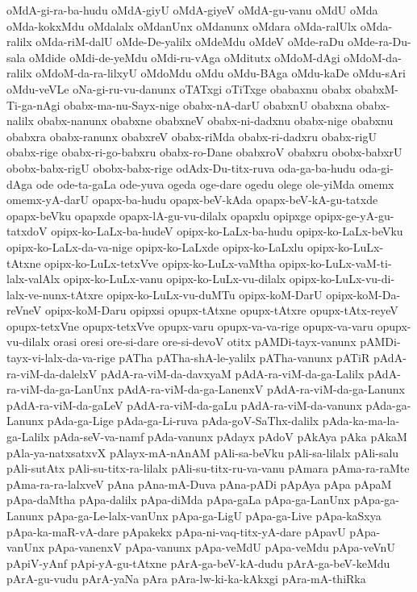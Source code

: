 {oMdA-gi-ra-ba-hudu
oMdA-giyU
oMdA-giyeV
oMdA-gu-vanu
oMdU
oMda
oMda-kokxMdu
oMdalalx
oMdanUnx
oMdanunx
oMdara
oMda-ralUlx
oMda-ralilx
oMda-riM-dalU
oMde-De-yalilx
oMdeMdu
oMdeV
oMde-raDu
oMde-ra-Du-sala
oMdide
oMdi-de-yeMdu
oMdi-ru-vAga
oMditutx
oMdoM-dAgi
oMdoM-da-ralilx
oMdoM-da-ra-lilxyU
oMdoMdu
oMdu
oMdu-BAga
oMdu-kaDe
oMdu-sAri
oMdu-veVLe
oNa-gi-ru-vu-danunx
oTATxgi
oTiTxge
obabaxnu
obabx
obabxM-Ti-ga-nAgi
obabx-ma-nu-Sayx-nige
obabx-nA-darU
obabxnU
obabxna
obabx-nalilx
obabx-nanunx
obabxne
obabxneV
obabx-ni-dadxnu
obabx-nige
obabxnu
obabxra
obabx-ranunx
obabxreV
obabx-riMda
obabx-ri-dadxru
obabx-rigU
obabx-rige
obabx-ri-go-babxru
obabx-ro-Dane
obabxroV
obabxru
obobx-babxrU
obobx-babx-rigU
obobx-babx-rige
odAdx-Du-titx-ruva
oda-ga-ba-hudu
oda-gi-dAga
ode
ode-ta-gaLa
ode-yuva
ogeda
oge-dare
ogedu
olege
ole-yiMda
omemx
omemx-yA-darU
opapx-ba-hudu
opapx-beV-kAda
opapx-beV-kA-gu-tatxde
opapx-beVku
opapxde
opapx-lA-gu-vu-dilalx
opapxlu
opipxge
opipx-ge-yA-gu-tatxdoV
opipx-ko-LaLx-ba-hudeV
opipx-ko-LaLx-ba-hudu
opipx-ko-LaLx-beVku
opipx-ko-LaLx-da-va-nige
opipx-ko-LaLxde
opipx-ko-LaLxlu
opipx-ko-LuLx-tAtxne
opipx-ko-LuLx-tetxVve
opipx-ko-LuLx-vaMtha
opipx-ko-LuLx-vaM-ti-lalx-valAlx
opipx-ko-LuLx-vanu
opipx-ko-LuLx-vu-dilalx
opipx-ko-LuLx-vu-di-lalx-ve-nunx-tAtxre
opipx-ko-LuLx-vu-duMTu
opipx-koM-DarU
opipx-koM-Da-reVneV
opipx-koM-Daru
opipxsi
opupx-tAtxne
opupx-tAtxre
opupx-tAtx-reyeV
opupx-tetxVne
opupx-tetxVve
opupx-varu
opupx-va-va-rige
opupx-va-varu
opupx-vu-dilalx
orasi
oresi
ore-si-dare
ore-si-devoV
otitx
pAMDi-tayx-vanunx
pAMDi-tayx-vi-lalx-da-va-rige
pATha
pATha-shA-le-yalilx
pATha-vanunx
pATiR
pAdA-ra-viM-da-dalelxV
pAdA-ra-viM-da-davxyaM
pAdA-ra-viM-da-ga-Lalilx
pAdA-ra-viM-da-ga-LanUnx
pAdA-ra-viM-da-ga-LanenxV
pAdA-ra-viM-da-ga-Lanunx
pAdA-ra-viM-da-gaLeV
pAdA-ra-viM-da-gaLu
pAdA-ra-viM-da-vanunx
pAda-ga-Lanunx
pAda-ga-Lige
pAda-ga-Li-ruva
pAda-goV-SaThx-dalilx
pAda-ka-ma-la-ga-Lalilx
pAda-seV-va-namf
pAda-vanunx
pAdayx
pAdoV
pAkAya
pAka
pAkaM
pAla-ya-natxsatxvX
pAlayx-mA-nAnAM
pAli-sa-beVku
pAli-sa-lilalx
pAli-salu
pAli-sutAtx
pAli-su-titx-ra-lilalx
pAli-su-titx-ru-va-vanu
pAmara
pAma-ra-raMte
pAma-ra-ra-lalxveV
pAna
pAna-mA-Duva
pAna-pADi
pApAya
pApa
pApaM
pApa-daMtha
pApa-dalilx
pApa-diMda
pApa-gaLa
pApa-ga-LanUnx
pApa-ga-Lanunx
pApa-ga-Le-lalx-vanUnx
pApa-ga-LigU
pApa-ga-Live
pApa-kaSxya
pApa-ka-maR-vA-dare
pApakekx
pApa-ni-vaq-titx-yA-dare
pApavU
pApa-vanUnx
pApa-vanenxV
pApa-vanunx
pApa-veMdU
pApa-veMdu
pApa-veVnU
pApiV-yAnf
pApi-yA-gu-tAtxne
pArA-ga-beV-kA-dudu
pArA-ga-beV-keMdu
pArA-gu-vudu
pArA-yaNa
pAra
pAra-lw-ki-ka-kAkxgi
pAra-mA-thiRka
}

